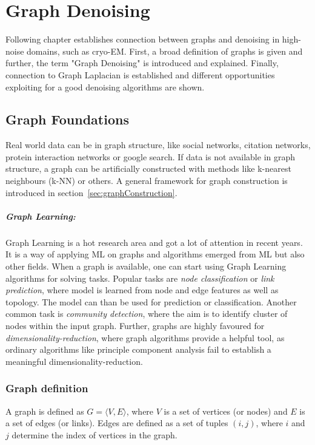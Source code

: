 \chapter{Graph Denoising}
\label{sec:graphFoundations}
    

Following chapter establishes connection between graphs and denoising in high-noise 
domains, such as cryo-EM.
First, a broad definition of graphs is given and further, the term "Graph Denoising" is
introduced and explained. Finally, connection to Graph Laplacian is established
and different opportunities exploiting for a good denoising algorithms are shown.

\section{Graph Foundations}
Real world data can be in graph structure, like social networks, citation networks,
protein interaction networks or google search. 
If data is not available in graph structure, a graph can be artificially constructed with methods like k-nearest neighbours (k-NN) or others.
A general framework for graph construction is introduced in section~\ref{sec:graphConstruction}.

\paragraph{Graph Learning:} Graph Learning is a hot research area and got a lot of attention in recent years.
It is a way of applying ML on graphs and algorithms emerged from ML but also other fields.
When a graph is available, one can start using Graph Learning algorithms for solving tasks.
Popular tasks are \textit{node classification} or \textit{link prediction}, where model is learned from node and edge features 
as well as topology. The model can than be used for prediction or classification.
Another common task is \textit{community detection}, where the aim is to identify cluster of nodes within the input graph.
Further, graphs are highly favoured for \textit{dimensionality-reduction}, where 
graph algorithms provide a helpful tool, as ordinary algorithms like principle component analysis fail to 
establish a meaningful dimensionality-reduction.

\subsection{Graph definition}
A graph is defined as $G = \langle V,E \rangle$, where $V$ is a set of 
vertices (or nodes) and $E$ is a set of edges (or links). 
Edges are defined as a set of tuples $(i, j)$, where $i$ and $j$ determine 
the index of vertices in the graph.

